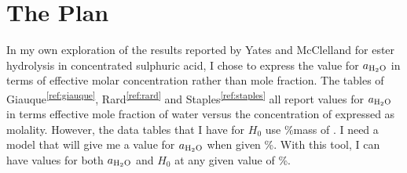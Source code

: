 \documentclass[]{tufte-handout}
\newcommand{\tss}[1]{\textsuperscript{#1}}
\begin{document}
\clearpage
\section{The Plan}

In my own exploration of the results reported by Yates and McClelland for ester hydrolysis
in concentrated sulphuric acid, I chose to express the value for $a_{\ce{H2O}}$ in terms of effective molar concentration rather than mole fraction. The tables of Giauque\tss{\ref{ref:giauque}}, Rard\tss{\ref{ref:rard}} and Staples\tss{\ref{ref:staples}} all report values for $a_{\ce{H2O}}$ in terms effective mole fraction of water versus the concentration of  expressed as molality. However, the data tables that I have for $H_0$ use \%mass of . I need a model that will give me a value for $a_{\ce{H2O}}$ when given \%. With this tool, I can have values for both $a_{\ce{H2O}}$ and $H_0$ at any given value of \%. 
\end{document}
